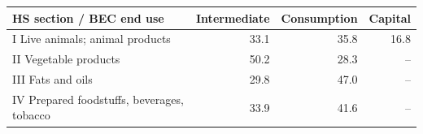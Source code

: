 \begin{tabular}{lrrr}
\toprule
HS section / BEC end use & Intermediate & Consumption & Capital \\
\midrule
I Live animals; animal products & 33.1 & 35.8 & 16.8 \\
II Vegetable products & 50.2 & 28.3 & -- \\
III Fats and oils & 29.8 & 47.0 & -- \\
IV Prepared foodstuffs, beverages, tobacco & 33.9 & 41.6 & -- \\
\bottomrule
\end{tabular}
